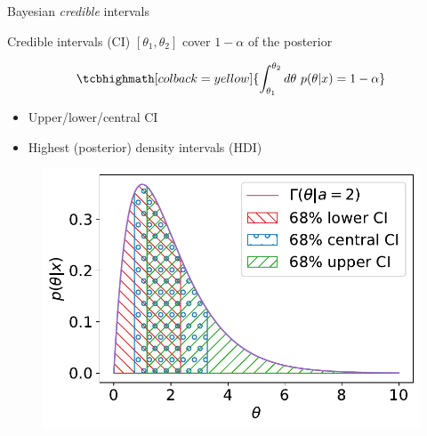 \documentclass[
aspectratio=169,
14pt,
professionalfonts
]{beamer}
\begin{document}
\begin{frame}{Bayesian \textit{credible} intervals}

Credible intervals (CI) $[\theta_1, \theta_2]$ cover $1-\alpha$ of the posterior
\begin{minipage}{0.49\linewidth}
    $$
    \tcbhighmath[colback=yellow]{
    \int_{\theta_1}^{\theta_2} d\theta ~ p(\theta| x) = 1-\alpha
    }
    $$
    \begin{itemize}
        \item Upper/lower/central CI
        \item Highest (posterior) density intervals (HDI)
    \end{itemize}
\end{minipage}
\begin{minipage}{0.49\linewidth}
    \begin{figure}
        \centering
        \includegraphics[width=\linewidth]{../plots/intervals.pdf}
    \end{figure}
\end{minipage}

\end{frame}
\end{document}
